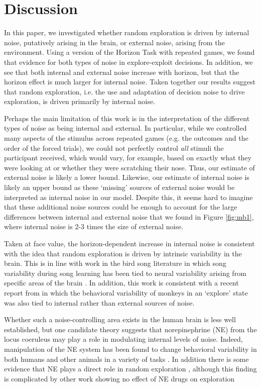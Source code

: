 \documentclass[12pt]{article}
\begin{document}
	\section*{Discussion}
	In this paper, we investigated whether random exploration is driven by internal noise, putatively arising in the brain, or external noise, arising from the environment. Using a version of the Horizon Task with repeated games, we found that evidence for both types of noise in explore-exploit decisions. In addition, we see that both internal and external noise increase with horizon, but that the horizon effect is much larger for internal noise.  Taken together our results suggest that random exploration, i.e. the use and adaptation of decision noise to drive exploration, is driven primarily by internal noise.

	Perhaps the main limitation of this work is in the interpretation of the different types of noise as being internal and external. In particular, while we controlled many aspects of the stimulus across repeated games (e.g. the outcomes and the order of the forced trials), we could not perfectly control {\it all} stimuli the participant received, which would vary, for example, based on exactly what they were looking at or whether they were scratching their nose. Thus, our estimate of external noise is likely a lower bound. Likewise, our estimate of internal noise is likely an upper bound as these `missing' sources of external noise would be interpreted as internal noise in our model. Despite this, it seems hard to imagine that these additional noise sources could be enough to account for the large differences between internal and external noise that we found in Figure \ref{fig:mb1}, where internal noise is 2-3 times the size of external noise.  
	
	Taken at face value, the horizon-dependent increase in internal noise is consistent with the idea that random exploration is driven by intrinsic variability in the brain. This is in line with work in the bird song literature in which song variability during song learning has been tied to neural variability arising from specific areas of the brain \citep{songbird1, songbird2}. In addition, this work is consistent with a recent report from \cite{ebitz17} in which the behavioral variability of monkeys in an `explore' state was also tied to internal rather than external sources of noise. 
	
	Whether such a noise-controlling area exists in the human brain is less well established, but one candidate theory \citep{aj2005} suggests that norepinephrine (NE) from the locus coeruleus may play a role in modulating internal levels of noise. Indeed, manipulation of the NE system has been found to change behavioral variability in both humans and other animals in a variety of tasks \citep{eeKarpova14, eeKeung18}.  In addition there is some evidence that NE plays a direct role in random exploration \citep{eeWarren17}, although this finding is complicated by other work showing no effect of NE drugs on exploration \citep{jepma2012, nieuwenhuis05}
	
\end{document}
